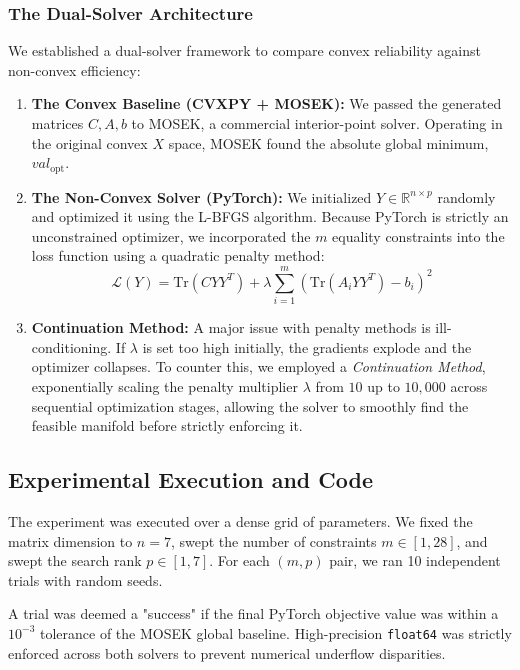 \subsubsection{The Dual-Solver Architecture}
We established a dual-solver framework to compare convex reliability against non-convex efficiency:
\begin{enumerate}
    \item \textbf{The Convex Baseline (CVXPY + MOSEK):} We passed the generated matrices $C, A, b$ to MOSEK, a commercial interior-point solver. Operating in the original convex $X$ space, MOSEK found the absolute global minimum, $val_{\text{opt}}$.
    \item \textbf{The Non-Convex Solver (PyTorch):} We initialized $Y \in \mathbb{R}^{n \times p}$ randomly and optimized it using the L-BFGS algorithm. Because PyTorch is strictly an unconstrained optimizer, we incorporated the $m$ equality constraints into the loss function using a quadratic penalty method:
    \begin{equation}
        \mathcal{L}(Y) = \text{Tr}(C YY^T) + \lambda \sum_{i=1}^m \left( \text{Tr}(A_i YY^T) - b_i \right)^2
    \end{equation}
    \item \textbf{Continuation Method:} A major issue with penalty methods is ill-conditioning. If $\lambda$ is set too high initially, the gradients explode and the optimizer collapses. To counter this, we employed a \textit{Continuation Method}, exponentially scaling the penalty multiplier $\lambda$ from $10$ up to $10,000$ across sequential optimization stages, allowing the solver to smoothly find the feasible manifold before strictly enforcing it.
\end{enumerate}

\subsection{Experimental Execution and Code}
The experiment was executed over a dense grid of parameters. We fixed the matrix dimension to $n=7$, swept the number of constraints $m \in [1, 28]$, and swept the search rank $p \in [1, 7]$. For each $(m, p)$ pair, we ran 10 independent trials with random seeds. 

A trial was deemed a "success" if the final PyTorch objective value was within a $10^{-3}$ tolerance of the MOSEK global baseline. High-precision \texttt{float64} was strictly enforced across both solvers to prevent numerical underflow disparities.

